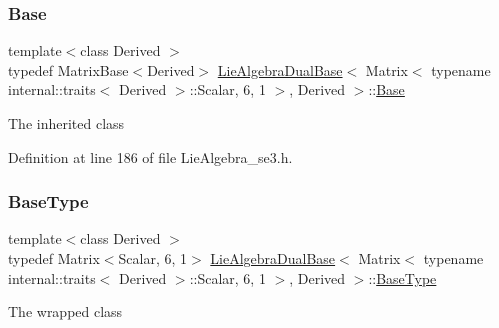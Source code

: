\subsubsection{\texorpdfstring{Base}{Base}}
{\footnotesize\ttfamily template$<$class Derived $>$ \\
typedef Matrix\+Base$<$Derived$>$ \hyperlink{class_lie_algebra_dual_base}{Lie\+Algebra\+Dual\+Base}$<$ Matrix$<$ typename internal\+::traits$<$ Derived $>$\+::Scalar, 6, 1 $>$, Derived $>$\+::\hyperlink{class_lie_algebra_dual_base_3_01_matrix_3_01typename_01internal_1_1traits_3_01_derived_01_4_1_1_7557dc73cbfcbc32e399b9855a977d47_a13f7decf31323f6148ba81f7431a8bac}{Base}\hspace{0.3cm}{\ttfamily [protected]}}

The inherited class 

Definition at line 186 of file Lie\+Algebra\+\_\+se3.\+h.

\hypertarget{class_lie_algebra_dual_base_3_01_matrix_3_01typename_01internal_1_1traits_3_01_derived_01_4_1_1_7557dc73cbfcbc32e399b9855a977d47_a9593517bd5d02d1330f7940eb5865eda}{}\label{class_lie_algebra_dual_base_3_01_matrix_3_01typename_01internal_1_1traits_3_01_derived_01_4_1_1_7557dc73cbfcbc32e399b9855a977d47_a9593517bd5d02d1330f7940eb5865eda} 
\subsubsection{\texorpdfstring{Base\+Type}{BaseType}}
{\footnotesize\ttfamily template$<$class Derived $>$ \\
typedef Matrix$<$Scalar, 6, 1$>$ \hyperlink{class_lie_algebra_dual_base}{Lie\+Algebra\+Dual\+Base}$<$ Matrix$<$ typename internal\+::traits$<$ Derived $>$\+::Scalar, 6, 1 $>$, Derived $>$\+::\hyperlink{class_lie_algebra_dual_base_3_01_matrix_3_01typename_01internal_1_1traits_3_01_derived_01_4_1_1_7557dc73cbfcbc32e399b9855a977d47_a9593517bd5d02d1330f7940eb5865eda}{Base\+Type}}

The wrapped class 


